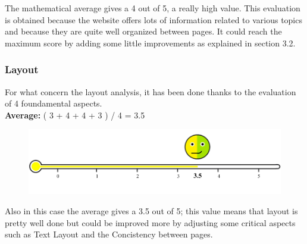 The mathematical average gives a 4 out of 5, a really high value. This evaluation is obtained because the website offers lots of information related to various topics and because they are quite well organized between pages. It could reach the maximum score by adding some little improvements as explained in section 3.2.

\subsubsection*{Layout}
For what concern the layout analysis, it has been done thanks to the evaluation of 4 foundamental aspects.\\
\textbf{Average: } ( 3 + 4 + 4 + 3 ) / 4 = 3.5 \\
\begin{figure}[h!]
	\centering
	\begin{minipage}[b]{1\textwidth}
    		\includegraphics[width=1\textwidth]{./assets/layout-navigation-value.png}
	\end{minipage}
\end{figure}
\FloatBarrier

Also in this case the average gives a 3.5 out of 5; this value means that layout is pretty well done but could be improved more by adjusting some critical aspects such as Text Layout and the Concistency between pages.
